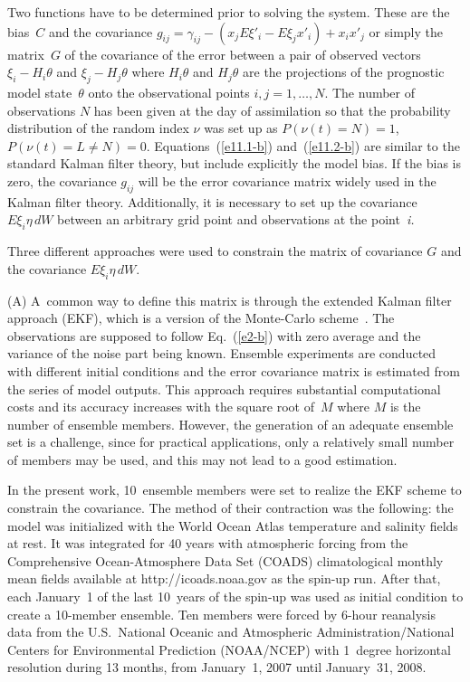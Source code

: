 \begin{multicols}{2}
Two functions have to be determined prior to solving the system. These are the bias~$C$ 
and the covariance $g_{ij} =\gamma_{ij} -(x_{j} E\xi '_{i} -E\xi_{j} x'_{i} )+x_{i} 
x'_{j} $ or simply the matrix~$G$ of the covariance of the error between a pair of observed 
vectors $\xi_{i} -H_{i} \theta $ and $\xi_{j} -H_{j} \theta $ where $H_{i} \theta $ and 
$H_{j} \theta$ are the projections of the prognostic model state~$\theta$ onto the 
observational points $i,j=1,\ldots ,N$. 
The number of observations $N$ has been given at the day of assimilation so that 
the probability distribution of the random index $\nu$ was set up as $P(\nu (t)=N)=1$, 
$P(\nu (t)=L\ne N)=0$. Equations~(\ref{e11.1-b}) and~(\ref{e11.2-b}) 
are similar to the standard Kalman 
filter theory, but include explicitly the model bias. If the bias is zero, the covariance 
$g_{ij} $ will be the error covariance matrix widely used in the Kalman filter theory. 
Additionally, it is necessary to set up the covariance $E\xi_{i} \eta\,dW$ between an 
arbitrary grid point and observations at the point~\textit{i.}

Three different approaches were used to constrain the matrix of covariance $G$ 
and the covariance $E\xi_{i} \eta\,dW$.

(A) A~common way to define this matrix is through the extended Kalman filter approach (EKF), 
which is a version of the Monte-Carlo scheme~\cite{2-b}. The observations are supposed to follow Eq.~(\ref{e2-b}) 
with zero average and the variance of the noise part being known. Ensemble experiments are conducted 
with different initial conditions and the error covariance matrix is estimated from the 
series of model outputs. This approach requires substantial computational costs and its 
accuracy increases with the square root of~$M$ where $M$ is the number of ensemble members. 
However, the generation of an adequate ensemble set is a challenge, since for practical 
applications, only a relatively small number of members may be used, and this may not 
lead to a good estimation.

In the present work, 10~ensemble members were set to realize the EKF scheme 
to constrain the covariance. The method of their contraction was the following: the 
model was initialized with the World Ocean Atlas temperature and salinity fields at 
rest. It was integrated for 40 years with atmospheric forcing from the Comprehensive 
Ocean-Atmosphere Data Set (COADS) climatological monthly mean fields available at 
{\sf http://icoads.noaa.gov} as the spin-up run. After that, each January~1 of the last 
10~years of the spin-up was used as initial condition to create a 10-member ensemble. 
Ten members were forced by 6-hour reanalysis data from the U.S.\ National Oceanic and 
Atmospheric Administration/National Centers for Environmental Prediction (NOAA/NCEP) 
with 1~degree horizontal resolution during 13 months, from  January~1, 2007 until 
January~31, 2008.


\end{multicols}
